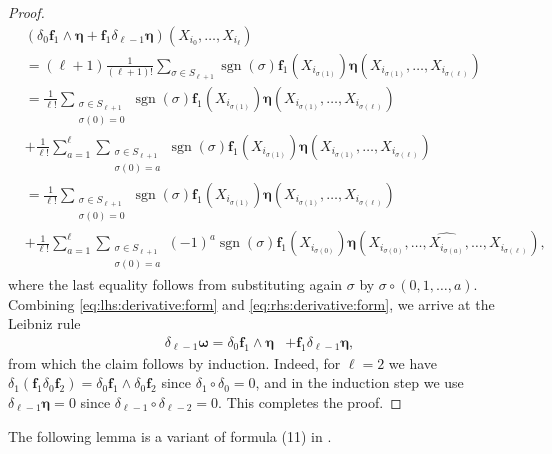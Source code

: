 \documentclass[10pt]{article}
\theoremstyle{plain}
\theoremstyle{definition}
\theoremstyle{remark}
\begin{document}
\begin{proof}
        \begin{align}
            &(\delta_0\mathbf{f}_1\wedge \boldsymbol{\eta}+\mathbf{f}_1\delta_{\ell-1}\boldsymbol{\eta})(X_{i_{0}},\dots, X_{i_{\ell}})\label{eq:rhs:derivative:form}\\
            &=(\ell+1)\frac{1}{(\ell+1)!}\sum_{\sigma\in S_{\ell+1}}\operatorname{sgn}(\sigma)\mathbf{f}_1(X_{i_{\sigma(1)}})\boldsymbol{\eta}(X_{i_{\sigma(1)}},\dots, X_{i_{\sigma(\ell)}})\nonumber\\
            &=\frac{1}{\ell!}\sum_{\substack{\sigma\in S_{\ell+1}\\\sigma(0)=0}}\operatorname{sgn}(\sigma)\mathbf{f}_1(X_{i_{\sigma(1)}})\boldsymbol{\eta}(X_{i_{\sigma(1)}},\dots, X_{i_{\sigma(\ell)}})\nonumber\\
            &+\frac{1}{\ell!}\sum_{a=1}^\ell\sum_{\substack{\sigma\in S_{\ell+1}\\\sigma(0)=a}}\operatorname{sgn}(\sigma)\mathbf{f}_1(X_{i_{\sigma(1)}})\boldsymbol{\eta}(X_{i_{\sigma(1)}},\dots, X_{i_{\sigma(\ell)}})\nonumber\\
            &=\frac{1}{\ell!}\sum_{\substack{\sigma\in S_{\ell+1}\\\sigma(0)=0}}\operatorname{sgn}(\sigma)\mathbf{f}_1(X_{i_{\sigma(1)}})\boldsymbol{\eta}(X_{i_{\sigma(1)}},\dots, X_{i_{\sigma(\ell)}})\nonumber\\
            &+\frac{1}{\ell!}\sum_{a=1}^\ell\sum_{\substack{\sigma\in S_{\ell+1}\\\sigma(0)=a}}(-1)^a\operatorname{sgn}(\sigma)\mathbf{f}_1(X_{i_{\sigma(0)}})\boldsymbol{\eta}(X_{i_{\sigma(0)}},\dots,\widehat{X_{i_{\sigma(a)}}},\dots,X_{i_{\sigma(\ell)}}),\nonumber
        \end{align}
        where the last equality follows from substituting again $\sigma$ by $\sigma\circ (0,1,\dots,a)$. Combining \eqref{eq:lhs:derivative:form} and \eqref{eq:rhs:derivative:form}, we arrive at the Leibniz rule \cite{War83} 
        \begin{align*}
            \delta_{\ell-1}\boldsymbol{\omega}=\delta_0\mathbf{f}_1\wedge \boldsymbol{\eta}&+\mathbf{f}_1\delta_{\ell-1}\boldsymbol{\eta}, 
        \end{align*}
        from which the claim follows by induction. Indeed, for $\ell=2$ we have $\delta_1(\mathbf{f}_1 \delta_0\mathbf{f}_2)=\delta_0\mathbf{f}_1\wedge \delta_0\mathbf{f}_2$ since $\delta_1\circ \delta_0=0$, and in the induction step we use $\delta_{\ell-1}\boldsymbol{\eta}=0$ since $\delta_{\ell-1}\circ \delta_{\ell-2}=0$. This completes the proof.
    \end{proof}
    The following lemma is a variant of formula (11) in \cite{HK24}.
\end{document}
